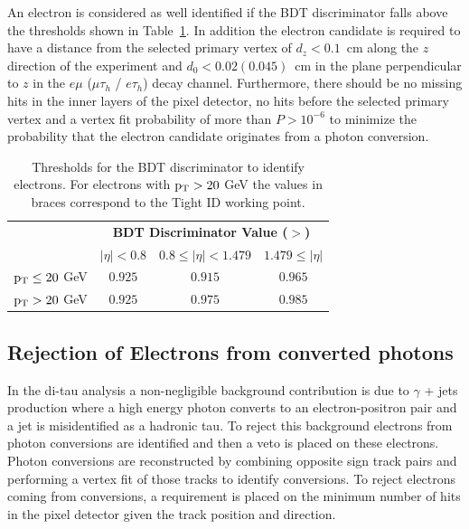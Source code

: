 An electron is considered as well identified if the BDT discriminator falls above the thresholds shown
in Table~\ref{tab:ElectronID-Thresholds}\@. In addition the electron candidate is required to have a
distance from the selected primary vertex of $d_{z}<0.1$~cm along the $z$ direction of the experiment
 and $d_{0}<0.02 (0.045)$~cm in the plane perpendicular to $z$ in the $e\mu$ ($\mu\tau_{h}$ / $e\tau_{h}$)
decay channel. Furthermore, there should be no missing hits in the inner layers of the pixel detector, no
hits before the selected primary vertex and a vertex fit probability of more than $P>10^{-6}$ to minimize the probability that the electron candidate originates from a photon conversion.

\begin{table}[!ht]
\begin{center}
\begin{tabular}{|l|c|c|c|}
\multicolumn{1}{c}{ }      & \multicolumn{3}{c}{\bf BDT Discriminator Value ($>$)}                 \\
\cline{2-4}
\multicolumn{1}{c|}{ }     & $|\eta|<0.8$      & $0.8 \leq |\eta| < 1.479$  & $1.479 \leq |\eta|$  \\
\hline
$\mathrm{p_{T}}\leq 20$ GeV          & $0.925$           & $0.915$                    & $0.965$              \\
$\mathrm{p_{T}}>    20$ GeV          & $0.925$ & $0.975$          & $0.985$    \\
\hline
\end{tabular}
\caption{
  Thresholds for the BDT discriminator to identify electrons. For electrons with $\mathrm{p_{T}}>20$ GeV the values in braces correspond to the Tight ID working point.}
\label{tab:ElectronID-Thresholds}
\end{center}
\end{table}

\subsection{Rejection of Electrons from converted photons} %
In the di-tau analysis a non-negligible background contribution 
is due to $\gamma$ + jets production where a high energy
photon converts to an electron-positron pair and a jet is
misidentified as a hadronic tau. To reject this background
electrons from photon conversions are identified and then 
a veto is placed on these electrons.
Photon conversions %
are reconstructed by combining opposite sign track pairs and performing
a vertex fit of those tracks to identify conversions.
To reject electrons coming from conversions, a requirement is placed
on the minimum number of hits in the pixel detector given the
track position and direction.

